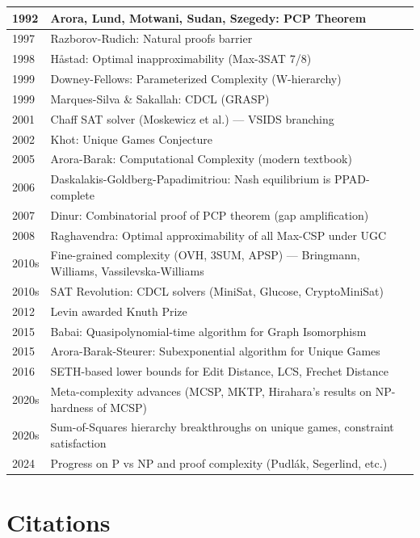 \begin{tabularx}{\linewidth}{|l|X|}
1992 & Arora, Lund, Motwani, Sudan, Szegedy: PCP Theorem \\ \hline
1997 & Razborov-Rudich: Natural proofs barrier \\ \hline
1998 & Håstad: Optimal inapproximability (Max-3SAT 7/8) \\ \hline
1999 & Downey-Fellows: Parameterized Complexity (W-hierarchy) \\ \hline
1999 & Marques-Silva \& Sakallah: CDCL (GRASP) \\ \hline
2001 & Chaff SAT solver (Moskewicz et al.) — VSIDS branching \\ \hline
2002 & Khot: Unique Games Conjecture \\ \hline
2005 & Arora-Barak: Computational Complexity (modern textbook) \\ \hline
2006 & Daskalakis-Goldberg-Papadimitriou: Nash equilibrium is PPAD-complete \\ \hline
2007 & Dinur: Combinatorial proof of PCP theorem (gap amplification) \\ \hline
2008 & Raghavendra: Optimal approximability of all Max-CSP under UGC \\ \hline
2010s & Fine-grained complexity (OVH, 3SUM, APSP) — Bringmann, Williams, Vassilevska-Williams \\ \hline
2010s & SAT Revolution: CDCL solvers (MiniSat, Glucose, CryptoMiniSat) \\ \hline
2012 & Levin awarded Knuth Prize \\ \hline
2015 & Babai: Quasipolynomial-time algorithm for Graph Isomorphism \\ \hline
2015 & Arora-Barak-Steurer: Subexponential algorithm for Unique Games \\ \hline
2016 & SETH-based lower bounds for Edit Distance, LCS, Frechet Distance \\ \hline
2020s & Meta-complexity advances (MCSP, MKTP, Hirahara's results on NP-hardness of MCSP) \\ \hline
2020s & Sum-of-Squares hierarchy breakthroughs on unique games, constraint satisfaction \\ \hline
2024 & Progress on P vs NP and proof complexity (Pudlák, Segerlind, etc.) \\ \hline
\end{tabularx}

\section{Citations}
\label{sec:np:citations}


